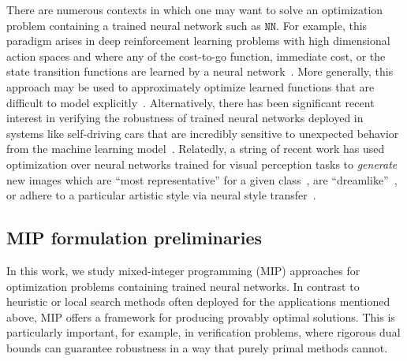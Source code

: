 \documentclass[smallextended]{svjour3}
\newcommand{\blue}[1]{{#1}}
\newcommand{\NN}{\texttt{NN}}
\begin{document}
There are numerous contexts in which one may want to solve an optimization problem containing a trained neural network such as $\NN{}$. For example, this paradigm arises in deep reinforcement learning problems with high dimensional action spaces and where any of the cost-to-go function, immediate cost, or the state transition functions are learned by a neural network~\cite{Arulkumaran:2017,Dulac-Arnold:2015,Mladenov:2017,Ryu:2019,Say:2017,Wu:2017}. \blue{More generally, this approach may be used to approximately optimize learned functions that are difficult to model explicitly~\cite{Grimstad:2019,Lombardi:2018,Lombardi:2017empirical}.} Alternatively, there has been significant recent interest in verifying the robustness of trained neural networks deployed in systems like self-driving cars that are incredibly sensitive to unexpected behavior from the machine learning model~\cite{Carlini:2016,Papernot:2016,Szegedy:2013}. Relatedly, a string of recent work has used optimization over neural networks trained for visual perception tasks to \emph{generate} new images which are ``most representative'' for a given class~\cite{Olah:2017}, are ``dreamlike''~\cite{Mordvintsev:2015}, or adhere to a particular artistic style via neural style transfer~\cite{Gatys:2015}.

\subsection{MIP formulation preliminaries} \label{sec:preliminaries}

In this work, we study mixed-integer programming (MIP) approaches for optimization problems containing trained neural networks. In contrast to heuristic or local search methods often deployed for the applications mentioned above, MIP offers a framework for producing provably optimal solutions. This is particularly important, for example, in verification problems, where rigorous dual bounds can guarantee robustness in a way that purely primal methods cannot.
\end{document}
